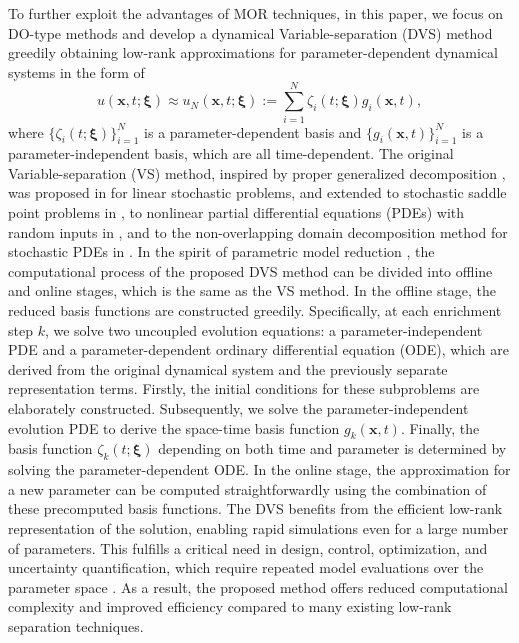 \documentclass[10pt,a4paper]{article}
\numberwithin{equation}{section}
\numberwithin{lemma}{section}
\numberwithin{example}{section}
\numberwithin{definition}{section}
\numberwithin{assumption}{section}
\numberwithin{theorem}{section}
\numberwithin{proposition}{section}
\numberwithin{corollary}{section}
\numberwithin{remark}{section}
\begin{document}
To further exploit the advantages of MOR techniques, 
in this paper, we focus on DO-type methods and develop a dynamical Variable-separation (DVS) method greedily obtaining low-rank approximations for parameter-dependent dynamical systems in the form of 
$$
u(\bm{x},t;\bm{\xi})\approx u_N(\bm{x},t;\bm{\xi}):=\sum_{i=1}^{N}\zeta_i(t;\bm{\xi})g_i(\bm{x},t),
$$
where $\{\zeta_i(t;\bm{\xi}) \}_{i=1}^{N}$ is a parameter-dependent basis and $\{ g_i(\bm{x},t)\}_{i=1}^{N}$ is a parameter-independent basis, which are all time-dependent. 
The original Variable-separation (VS) method, inspired by proper generalized decomposition \cite{Nouy2009recent,Nouy2009gener}, was proposed in \cite{Li2017a} for linear stochastic problems, and extended to stochastic saddle point problems in \cite{Jiang2018model}, to nonlinear partial differential equations (PDEs) with random inputs in \cite{Li2020a}, and to the non-overlapping domain decomposition method for stochastic PDEs in \cite{Chen2024stochastic}.
In the spirit of parametric model reduction \cite[Section 1.1]{P2015a}, the computational process of the proposed DVS method can be divided into offline and online stages,
which is the same as the VS method. 
In the offline stage, the reduced basis functions are constructed greedily. 
Specifically, at each enrichment step $k$, we solve two uncoupled evolution equations: a parameter-independent PDE and a parameter-dependent ordinary differential equation (ODE), which are derived from the original dynamical system and the previously separate representation terms. 
Firstly, the initial conditions for these subproblems are elaborately constructed. 
Subsequently, we solve the parameter-independent evolution PDE to derive the space-time basis function $g_k(\bm{x},t)$. 
Finally, the basis function $\zeta_k(t;\bm{\xi})$ depending on both time and parameter is determined by solving the parameter-dependent ODE. 
In the online stage, the approximation for a new parameter can be computed straightforwardly using the combination of these precomputed basis functions. The DVS benefits from the efficient low-rank representation of the solution, enabling rapid simulations even for a large number of parameters. 
This fulfills a critical need in design, control, optimization, and uncertainty quantification, which require repeated model evaluations over the parameter space \cite{P2015a}.
As a result, the proposed method offers reduced computational complexity and improved efficiency compared to many existing low-rank separation techniques.
\end{document}
